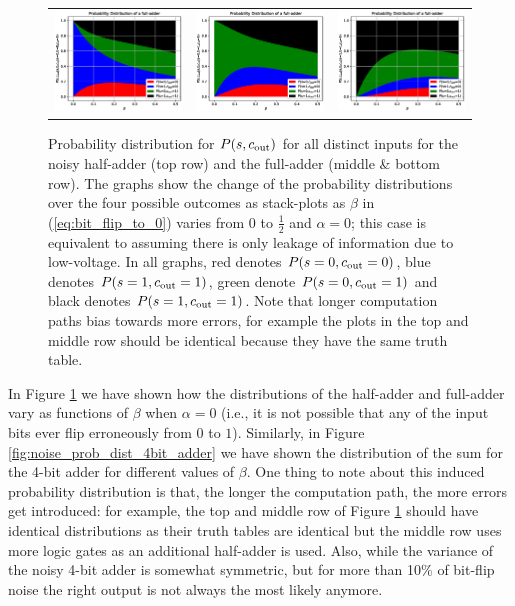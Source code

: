 \begin{figure}
\begin{tabular}{ccc}
        \includegraphics[width=.3\textwidth]{media/noisy_full_adder_value_dist_001.eps} &
        \includegraphics[width=.3\textwidth]{media/noisy_full_adder_value_dist_011.eps} &
        \includegraphics[width=.3\textwidth]{media/noisy_full_adder_value_dist_111.eps}   \\
    \end{tabular}
    \caption{Probability distribution for $P(s,c_{\mathrm{out}})$ for all distinct inputs for the noisy half-adder (top row) and the full-adder (middle \& bottom row). The graphs show the change of the probability distributions over the four possible outcomes as stack-plots as $\beta$ in (\ref{eq:bit_flip_to_0}) varies from $0$ to $\frac{1}{2}$ and $\alpha = 0$; this case is equivalent to assuming there is only leakage of information due to low-voltage. In all graphs, red denotes $P(s=0,c_{\mathrm{out}}=0)$, blue denotes $P(s=1,c_{\mathrm{out}}=1)$, green denote $P(s=0,c_{\mathrm{out}}=1)$ and black denotes $P(s=1,c_{\mathrm{out}}=1)$. Note that longer computation paths bias towards more errors, for example the plots in the top and middle row should be identical because they have the same truth table. \label{fig:noise_prob_dist}}
\end{figure}

In Figure \ref{fig:noise_prob_dist} we have shown how the distributions of the half-adder and full-adder vary as functions of $\beta$ when $\alpha=0$ (i.e., it is not possible that any of the input bits ever flip erroneously from $0$ to $1$). Similarly, in Figure \ref{fig:noise_prob_dist_4bit_adder} we have shown the distribution of the sum for the 4-bit adder for different values of $\beta$. One thing to note about this induced probability distribution is that, the longer the computation path, the more errors get introduced: for example, the top and middle row of Figure \ref{fig:noise_prob_dist} should have identical distributions as their truth tables are identical but the middle row uses more logic gates as an additional half-adder is used. Also, while the variance of the noisy 4-bit adder is somewhat symmetric, but for more than 10\% of bit-flip noise the right output is not always the most likely anymore.

